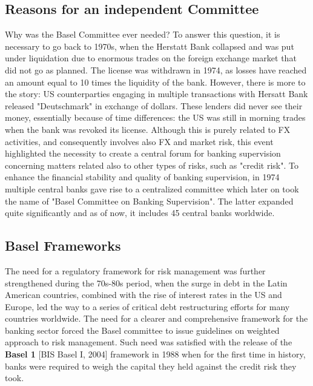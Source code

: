 \documentclass[a4paper,12pt]{article}
\begin{document}
    \subsection{Reasons for an independent Committee}
    Why was the Basel Committee ever needed? 
    To answer this question, it is necessary to go back to 1970s, 
    when the Herstatt Bank collapsed and was put under liquidation due to 
    enormous trades on the foreign exchange market that did not go as planned. 
    The license was withdrawn in 1974, as losses have reached an amount equal to 
    10 times the liquidity of the bank. However, there is more to the story: 
    US counterparties engaging in multiple transactions with Hersatt Bank released 
    "Deutschmark" in exchange of dollars.
    These lenders did never see their money, essentially because of time differences: 
    the US was still in morning trades when the bank was revoked its license. 
    Although this is purely related to FX activities, and consequently involves 
    also FX and market risk, this event highlighted the necessity to create a 
    central forum for banking supervision concerning matters related also to 
    other types of risks, such as "credit risk". To enhance the financial stability 
    and quality of banking supervision, in 1974 multiple central banks gave rise to a 
    centralized committee which later on took the name of "Basel Committee on 
    Banking Supervision". The latter expanded quite significantly and as of now, 
    it includes 45 central banks worldwide.

    \subsection{Basel Frameworks}

    The need for a regulatory framework for risk management was further strengthened 
    during the 70s-80s period, when the surge in debt in the Latin American countries, 
    combined with the rise of interest rates in the US and Europe, led the way to a 
    series of critical debt restructuring efforts for many countries worldwide. 
    The need for a clearer and comprehensive framework for the banking sector 
    forced the Basel committee to issue guidelines on weighted approach to 
    risk management. 
    Such need was satisfied with the release of the \textbf{Basel 1} [BIS Basel I, 2004] 
    framework in 1988 when for the first time in history, 
    banks were required to weigh the capital they held against the credit risk they took. 
    
\end{document}

